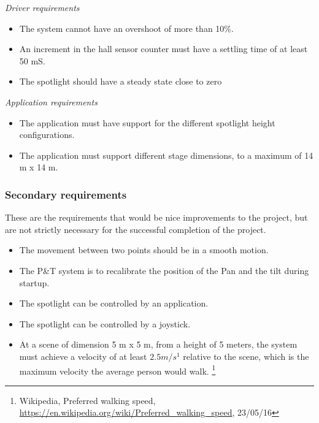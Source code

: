 \textit{Driver requirements}
\begin{itemize}
\item The system cannot have an overshoot of more than 10\%.

\item An increment in the hall sensor counter must have a settling time of at least 50 mS. 


\item The spotlight should have a steady state close to zero
\end{itemize}


\textit{Application requirements}
\begin{itemize}

\item The application must have support for the different spotlight height configurations.

\item The application must support different stage dimensions, to a maximum of 14 m x 14 m. 

\end{itemize}


\subsubsection{Secondary requirements}
These are the requirements that would be nice improvements to the project, but are not strictly necessary for the successful completion of the project. 

\begin{itemize}
\item The movement between two points should be in a smooth motion.

\item The P\&T system is to recalibrate the position of the Pan and the tilt during startup.

\item The spotlight can be controlled by an application.

\item The spotlight can be controlled by a joystick.

\item At a scene of dimension 5 m x 5 m, from a height of 5 meters, the system must achieve a velocity of at least $2.5 m/s^{1}$ relative to the scene, which is the maximum velocity the average person would walk. 
\footnote{Wikipedia, Preferred walking speed, \url{https://en.wikipedia.org/wiki/Preferred_walking_speed}, 23/05/16}

\end{itemize}
